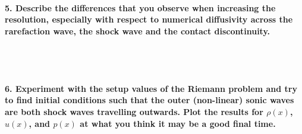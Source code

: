 \paragraph{5. Describe the differences that you observe 
    when increasing the resolution, especially with 
    respect to numerical diffusivity across the 
    rarefaction wave, the shock wave and the contact 
    discontinuity.
} \ \\
    \\

\paragraph{6. Experiment with the setup values of the 
    Riemann problem and try to find initial conditions 
    such that the outer (non-linear) sonic waves are both 
    shock waves travelling outwards. Plot the results for 
    $\rho(x)$, $u(x)$, and $p(x)$ at what you think it 
    may be a good final time.
} \ \\
    \\
